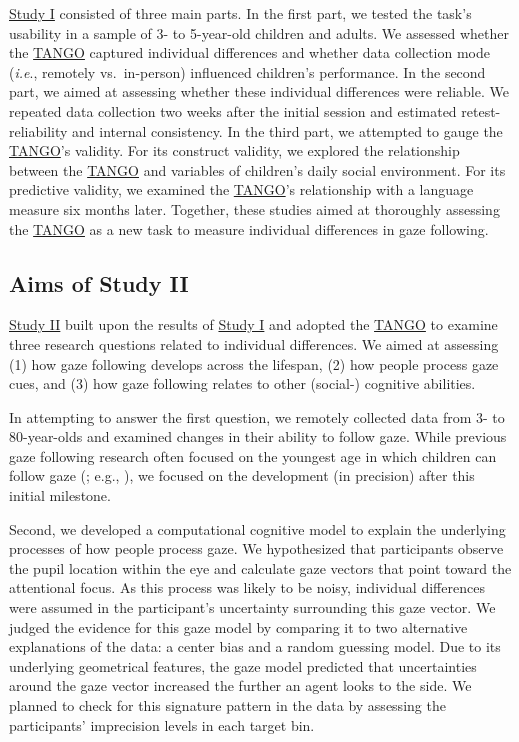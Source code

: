\documentclass[
]{scrbook}
\begin{document}
\hyperref[studyI]{Study I} consisted of three main parts. In the first part, we tested the task's usability in a sample of 3- to 5-year-old children and adults. We assessed whether the \hyperref[acronyms_TANGO]{TANGO} captured individual differences and whether data collection mode (\emph{i.e}., remotely vs.~in-person) influenced children's performance. In the second part, we aimed at assessing whether these individual differences were reliable. We repeated data collection two weeks after the initial session and estimated retest-reliability and internal consistency. In the third part, we attempted to gauge the \hyperref[acronyms_TANGO]{TANGO}'s validity. For its construct validity, we explored the relationship between the \hyperref[acronyms_TANGO]{TANGO} and variables of children's daily social environment. For its predictive validity, we examined the \hyperref[acronyms_TANGO]{TANGO}'s relationship with a language measure six months later. Together, these studies aimed at thoroughly assessing the \hyperref[acronyms_TANGO]{TANGO} as a new task to measure individual differences in gaze following.

\subsection{Aims of Study II}\label{aimsII}

\hyperref[studyII]{Study II} built upon the results of \hyperref[studyI]{Study I} and adopted the \hyperref[acronyms_TANGO]{TANGO} to examine three research questions related to individual differences. We aimed at assessing (1) how gaze following develops across the lifespan, (2) how people process gaze cues, and (3) how gaze following relates to other (social-) cognitive abilities.

In attempting to answer the first question, we remotely collected data from 3- to 80-year-olds and examined changes in their ability to follow gaze. While previous gaze following research often focused on the youngest age in which children can follow gaze (; e.g., ), we focused on the development (in precision) after this initial milestone.

Second, we developed a computational cognitive model to explain the underlying processes of how people process gaze. We hypothesized that participants observe the pupil location within the eye and calculate gaze vectors that point toward the attentional focus. As this process was likely to be noisy, individual differences were assumed in the participant's uncertainty surrounding this gaze vector. We judged the evidence for this gaze model by comparing it to two alternative explanations of the data: a center bias and a random guessing model. Due to its underlying geometrical features, the gaze model predicted that uncertainties around the gaze vector increased the further an agent looks to the side. We planned to check for this signature pattern in the data by assessing the participants' imprecision levels in each target bin.
\end{document}

